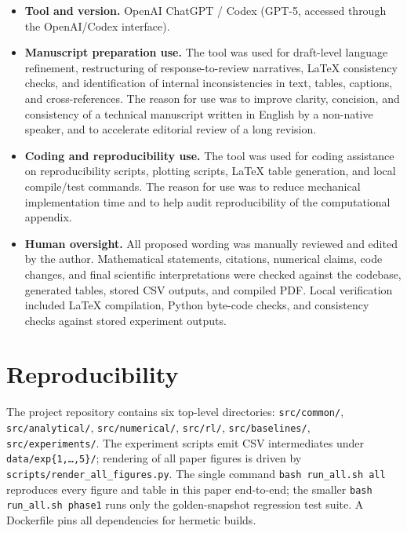 \documentclass[]{interact}
\theoremstyle{plain}
\theoremstyle{definition}
\theoremstyle{remark}
\newcommand{\1}[1]{\mathbf{1}_{\{#1\}}}
\begin{document}
\begin{itemize}
\item \textbf{Tool and version.} OpenAI ChatGPT / Codex (GPT-5, accessed through the OpenAI/Codex interface).
\item \textbf{Manuscript preparation use.} The tool was used for draft-level language refinement, restructuring of response-to-review narratives, LaTeX consistency checks, and identification of internal inconsistencies in text, tables, captions, and cross-references. The reason for use was to improve clarity, concision, and consistency of a technical manuscript written in English by a non-native speaker, and to accelerate editorial review of a long revision.
\item \textbf{Coding and reproducibility use.} The tool was used for coding assistance on reproducibility scripts, plotting scripts, LaTeX table generation, and local compile/test commands. The reason for use was to reduce mechanical implementation time and to help audit reproducibility of the computational appendix.
\item \textbf{Human oversight.} All proposed wording was manually reviewed and edited by the author. Mathematical statements, citations, numerical claims, code changes, and final scientific interpretations were checked against the codebase, generated tables, stored CSV outputs, and compiled PDF. Local verification included LaTeX compilation, Python byte-code checks, and consistency checks against stored experiment outputs.
\end{itemize}

\section{Reproducibility}\label{app:reproducibility}

The project repository contains six top-level directories:
\texttt{src/common/}, \texttt{src/analytical/}, \texttt{src/numerical/}, \texttt{src/rl/}, \texttt{src/baselines/}, \texttt{src/experiments/}.
The experiment scripts emit CSV intermediates under \texttt{data/exp\{1,\ldots,5\}/}; rendering of all paper figures is driven by \texttt{scripts/render\_all\_figures.py}. The single command
\texttt{bash run\_all.sh all} reproduces every figure and table in this paper end-to-end; the smaller \texttt{bash run\_all.sh phase1} runs only the golden-snapshot regression test suite. A Dockerfile pins all dependencies for hermetic builds.



\end{document}
